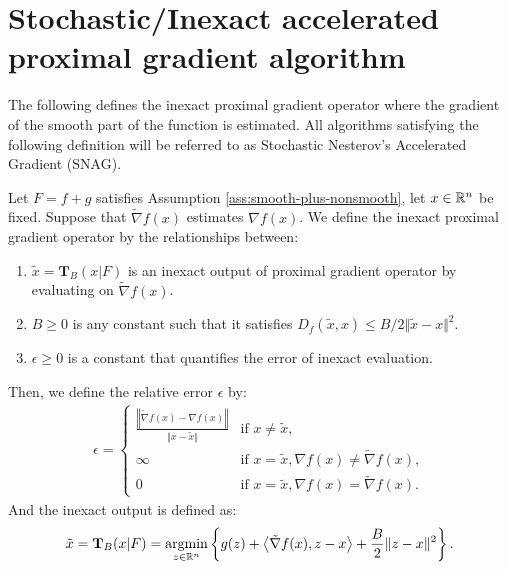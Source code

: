 \documentclass[12pt]{article}
\begin{document}
\section{Stochastic/Inexact accelerated proximal gradient algorithm}
    The following defines the inexact proximal gradient operator where the gradient of the smooth part of the function is estimated. 
    All algorithms satisfying the following definition will be referred to as Stochastic Nesterov's Accelerated Gradient (SNAG). 
    \begin{definition}
        Let $F = f + g$ satisfies Assumption \ref{ass:smooth-plus-nonsmooth}, let $x \in \mathbb R^n$ be fixed. 
        Suppose that $\tilde \nabla f(x)$ estimates $\nabla f(x)$. 
        We define the inexact proximal gradient operator by the relationships between: 
        \begin{enumerate}[nosep]
            \item $\tilde x = \mathbf T_B(x | F)$ is an inexact output of proximal gradient operator by evaluating on $\tilde \nabla f(x)$. 
            \item $B \ge 0$ is any constant such that it satisfies $D_f(\tilde x, x) \le B/2\Vert \tilde x - x\Vert^2$. 
            \item $\epsilon \ge 0$ is a constant that quantifies the error of inexact evaluation. 
        \end{enumerate}
        Then, we define the relative error $\epsilon$ by: 
        \begin{align*}
            \epsilon = \begin{cases}
                \frac{\left\Vert \tilde \nabla f(x) - \nabla f(x)\right\Vert}{\Vert x - \tilde x\Vert} & \text{if } x \neq \tilde x, 
                \\
                \infty & \text{if } x = \tilde x, \nabla f(x) \neq \tilde \nabla f(x), 
                \\
                0 & \text{if } x = \tilde x, \nabla f(x) = \tilde \nabla f(x). 
            \end{cases}
        \end{align*}
        And the inexact output is defined as: 
        \begin{align*}
            \tilde x = \mathbf T_B(x | F) = \mathop{\rm argmin}\limits_{z \in \mathbb R^n}\left\lbrace
                g(z) + \left\langle \tilde \nabla f(x), z - x\right\rangle
                + \frac{B}{2}\Vert z - x\Vert^2
            \right\rbrace. 
        \end{align*}
    \end{definition}
\end{document}
